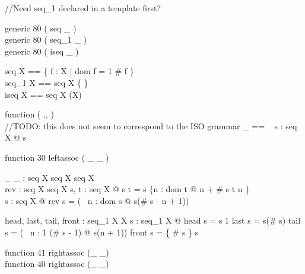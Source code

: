 //Need seq_1 declared in a template first?
\begin{zed}
  generic 80 ( seq \_ )\\
  generic 80 ( seq_1 \_ )\\
  generic 80 ( iseq \_ )
\end{zed}

\begin{zed}
  seq X == \{ f : \nat \ffun X | dom f = 1 \upto \# f \}\\
  seq_1 X == seq X \setminus \{ \emptyset \}\\
  iseq X == seq X \cap (\nat \pinj X)
\end{zed}

\begin{zed}
  function ( \langle ,, \rangle )\\
//TODO: this does not seem to correspond to the ISO grammar
  \langle \_ \rangle [X] == \lambda~ s : seq X @ s
\end{zed}

\begin{zed}
  function 30 leftassoc ( \_ \cat \_ )
\end{zed}

\begin{gendef}[X]
  \_ \cat \_ : seq X \cross seq X \fun seq X\\
  rev : seq X \fun seq X
\where
  \forall s, t : seq X @ s \cat t = s \cup \{n : dom t @ n + \# s \mapsto t n \}\\
  \forall s : seq X @ rev s = (\lambda~ n : dom s @ s(\# s - n + 1))
\end{gendef}

\begin{gendef}[X]
  head, last, tail, front : seq_1 X \fun X
\where
  \forall s : seq_1 X @
     head s = s 1 \land
     last s = s(\# s) \land
     tail s = (\lambda~ n : 1 \upto (\# s - 1) @ s(n + 1)) \land
     front s = \{ \# s \} \ndres s
\end{gendef}


\begin{zed}
  function 41 rightassoc (\_ \extract \_)\\
  function 40 rightassoc (\_ \filter \_)
\end{zed}

